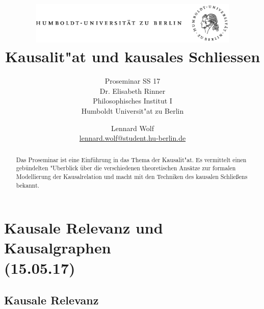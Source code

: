 \documentclass[emulatestandardclasses]{scrartcl}
\date{\vspace{-3ex}}
\begin{document}
\title{
	\includegraphics*[width=0.75\textwidth]{ErstesSem/images/hu_logo.png}\\
	\vspace{24pt}
	Kausalit"at und kausales Schliessen}
\subtitle{Proseminar SS 17\\
          Dr. Elisabeth Rinner\\
          Philosophisches Institut I \\ 
          Humboldt Universit"at zu Berlin}
\author{Lennard Wolf\\
        \small{\href{mailto:lennard.wolf@student.hu-berlin.de}{lennard.wolf@student.hu-berlin.de}}}
\maketitle
\begin{abstract}

Das Proseminar ist eine Einführung in das Thema der Kausalit"at. Es vermittelt einen gebündelten "Uberblick über die verschiedenen theoretischen Ansätze zur formalen Modellierung der Kausalrelation und macht mit den Techniken des kausalen Schließens bekannt.

\end{abstract}
\newpage

\tableofcontents
\listoffigures
\newpage


\section{Kausale Relevanz und Kausalgraphen
\\(15.05.17)}

\subsection{Kausale Relevanz}
\end{document}
